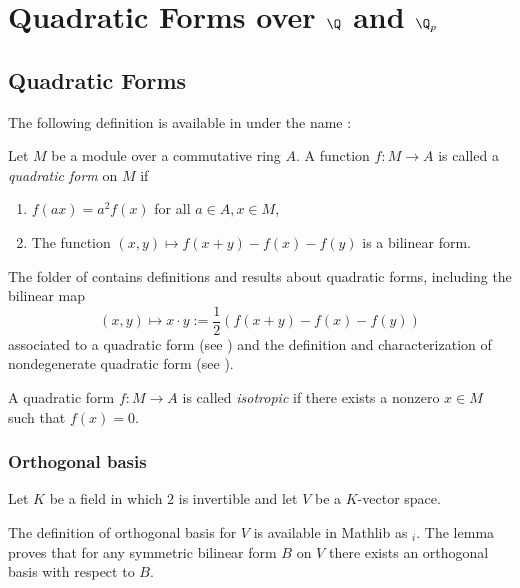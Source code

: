 \chapter[Quadratic Forms over the Rationals and the p-adics]{Quadratic Forms over $\Q$ and $\Q_p$}

\section{Quadratic Forms}\label{sec:quadratic_form}

The following definition is available in \mathlib under the name :
\begin{definition}\label{def:quadratic_form}\leanok
Let $M$ be a module over a commutative ring $A$. A function $f : M \to A$ is called a \emph{quadratic form} on $M$ if 
\begin{enumerate}
\item $f(ax) = a^2f(x)$ for all $a \in A, x \in M$,
\item The function $(x, y) \mapsto f(x + y) - f(x) - f(y)$ is a bilinear form.
\end{enumerate}
\end{definition}

The  folder of \mathlib contains definitions and results about quadratic forms, including the bilinear map 
\[ (x, y) \mapsto x \cdot y := \frac{1}{2}(f(x + y) - f(x) - f(y))\] associated to a quadratic form (see ) and the definition and characterization of nondegenerate quadratic form (see ).

\begin{definition}\label{def:isotropic}
\leanok
A quadratic form $f : M \to A$ is called \emph{isotropic} if there exists a nonzero $x \in M$ such that $f(x) = 0$.
\end{definition}

\subsection{Orthogonal basis}\label{subsec:ortho_basis}

Let $K$ be a field in which $2$ is invertible and let $V$ be a $K$-vector space.

The definition of orthogonal basis for $V$ is available in Mathlib as $_i$. The lemma  proves that for any symmetric bilinear form $B$ on $V$ there exists an orthogonal basis with respect to $B$.

